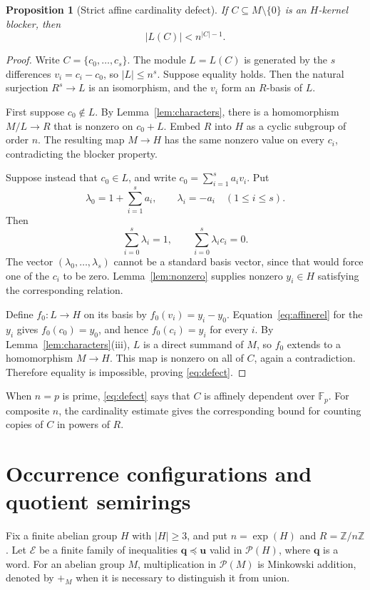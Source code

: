 \documentclass[11pt,reqno]{amsart}
\newtheorem{proposition}[theorem]{Proposition}
\theoremstyle{definition}
\numberwithin{equation}{section}
\newcommand{\Pow}{\mathcal{P}}
\newcommand{\expon}{\operatorname{exp}}
\newcommand{\Z}{\mathbb{Z}}
\newcommand{\F}{\mathbb{F}}
\newcommand{\bu}{\mathbf{u}}
\newcommand{\bq}{\mathbf{q}}
\newcommand{\calE}{\mathcal{E}}
\renewcommand{\leq}{\leqslant}
\renewcommand{\geq}{\geqslant}
\begin{document}
\begin{proposition}[Strict affine cardinality defect]\label{prop:defect}
If $C\subseteq M\setminus\{0\}$ is an $H$-kernel blocker, then
\begin{equation}\label{eq:defect}
 |L(C)|<n^{|C|-1}.
\end{equation}
\end{proposition}
\begin{proof}
Write $C=\{c_0,\ldots,c_s\}$. The module $L=L(C)$ is generated by the $s$ differences $v_i=c_i-c_0$, so $|L|\leq n^s$. Suppose equality holds. Then the natural surjection $R^s\to L$ is an isomorphism, and the $v_i$ form an $R$-basis of $L$.

First suppose $c_0\notin L$. By Lemma~\ref{lem:characters}, there is a homomorphism $M/L\to R$ that is nonzero on $c_0+L$. Embed $R$ into $H$ as a cyclic subgroup of order $n$. The resulting map $M\to H$ has the same nonzero value on every $c_i$, contradicting the blocker property.

Suppose instead that $c_0\in L$, and write $c_0=\sum_{i=1}^{s}a_i v_i$. Put
\[
 \lambda_0=1+\sum_{i=1}^{s}a_i,\qquad \lambda_i=-a_i\quad(1\leq i\leq s).
\]
Then
\begin{equation}\label{eq:affinerel}
 \sum_{i=0}^{s}\lambda_i=1,\qquad \sum_{i=0}^{s}\lambda_i c_i=0.
\end{equation}
The vector $(\lambda_0,\ldots,\lambda_s)$ cannot be a standard basis vector, since that would force one of the $c_i$ to be zero. Lemma~\ref{lem:nonzero} supplies nonzero $y_i\in H$ satisfying the corresponding relation.

Define $f_0:L\to H$ on its basis by $f_0(v_i)=y_i-y_0$. Equation~\eqref{eq:affinerel} for the $y_i$ gives $f_0(c_0)=y_0$, and hence $f_0(c_i)=y_i$ for every $i$. By Lemma~\ref{lem:characters}(iii), $L$ is a direct summand of $M$, so $f_0$ extends to a homomorphism $M\to H$. This map is nonzero on all of $C$, again a contradiction. Therefore equality is impossible, proving \eqref{eq:defect}.
\end{proof}

When $n=p$ is prime, \eqref{eq:defect} says that $C$ is affinely dependent over $\F_p$. For composite $n$, the cardinality estimate gives the corresponding bound for counting copies of $C$ in powers of $R$.

\section{Occurrence configurations and quotient semirings}\label{sec:quotients}
Fix a finite abelian group $H$ with $|H|\geq 3$, and put $n=\expon(H)$ and $R=\Z/n\Z$. Let $\calE$ be a finite family of inequalities $\bq\preceq\bu$ valid in $\Pow(H)$, where $\bq$ is a word. For an abelian group $M$, multiplication in $\Pow(M)$ is Minkowski addition, denoted by $+_M$ when it is necessary to distinguish it from union.
\end{document}
